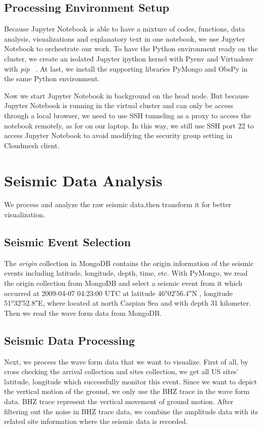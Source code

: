 \documentclass[9pt,twocolumn,twoside]{../../styles/osajnl}
\begin{document}
\subsection{Processing Environment Setup}

Because Jupyter Notebook is able to have a mixture of codes, functions, data analysis, visualizations and explanatory text in one notebook, we use Jupyter Notebook to orchestrate our work. To have the Python environment ready on the cluster, we create an isolated Jupyter ipython kernel with Pyenv and Virtualenv with \textit{pip} ~\cite{www-notekernelsetup}. At last, we install the supporting libraries PyMongo and ObsPy in the same Python environment.

Now we start Jupyter Notebook in background on the head node. But because Jupyter Notebook is running in the virtual cluster and can only be access through a local browser, we need to use SSH tunneling as a proxy to access the notebook remotely, as for on our laptop. In this way, we still use SSH port 22 to access Jupyter Notebook to avoid modifying the security group setting in Cloudmesh client.

\section{Seismic Data Analysis}

We process and analyze the raw seismic data,then transform it for better visualization.

\subsection{Seismic Event Selection}
The \textit{origin} collection in MongoDB contains the origin information of the seismic events including latitude, longitude, depth, time, etc. With PyMongo, we read the origin collection from MongoDB and select a seismic event from it which occurred at 2009-04-07 04:23:00 UTC at latitude \ang{46;02;56.4}N , longitude \ang{51;32;52.8}E, where located at north Caspian Sea and with depth 31 kilometer. Then we read the wave form data from MongoDB.

\subsection{Seismic Data Processing}
Next, we process the wave form data that we want to visualize. First of all, by cross checking the arrival collection and sites collection, we get all US sites' latitude, longitude which successfully monitor this event. Since we want to depict the vertical motion of the ground, we only use the BHZ trace in the wave form data. BHZ trace represent the vertical movement of ground motion. After filtering out the noise in BHZ trace data, we combine the amplitude data with its related site information where the seismic data is recorded.
\end{document}
